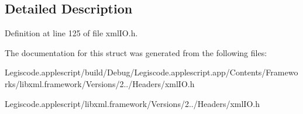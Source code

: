 \subsection{Detailed Description}


Definition at line 125 of file xml\-I\-O.\-h.



The documentation for this struct was generated from the following files\-:\begin{DoxyCompactItemize}
\item 
Legiscode.\-applescript/build/\-Debug/\-Legiscode.\-applescript.\-app/\-Contents/\-Frameworks/libxml.\-framework/\-Versions/2../\-Headers/xml\-I\-O.\-h\item 
Legiscode.\-applescript/libxml.\-framework/\-Versions/2../\-Headers/xml\-I\-O.\-h\end{DoxyCompactItemize}

